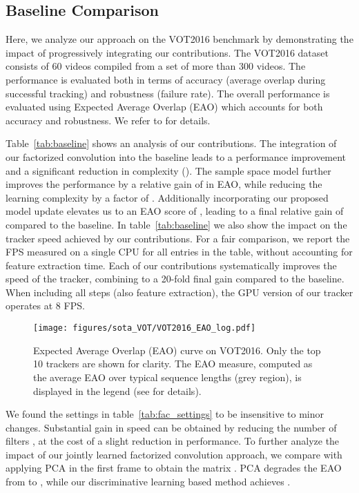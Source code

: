 \documentclass[10pt,twocolumn,letterpaper]{article}
\begin{document}
\subsection{Baseline Comparison}
\label{sec:baseline_results}

Here, we analyze our approach on the VOT2016 benchmark by demonstrating the impact of progressively integrating our contributions. The VOT2016 dataset consists of 60 videos compiled from a set of more than 300 videos. The performance is evaluated both in terms of accuracy (average overlap during successful tracking) and robustness (failure rate). The overall performance is evaluated using Expected Average Overlap (EAO) which accounts for both accuracy and robustness. We refer to \cite{VOT2015} for details.

Table~\ref{tab:baseline} shows an analysis of our contributions. The integration of our factorized convolution into the baseline leads to a performance improvement and a significant reduction in complexity (). The sample space model further improves the performance by a relative gain of  in EAO, while reducing the learning complexity by a factor of . Additionally incorporating our proposed model update elevates us to an EAO score of , leading to a final relative gain of  compared to the baseline. In table~\ref{tab:baseline} we also show the impact on the tracker speed achieved by our contributions. For a fair comparison, we report the FPS measured on a single CPU for all entries in the table, without accounting for feature extraction time. Each of our contributions systematically improves the speed of the tracker, combining to a 20-fold final gain compared to the baseline. When including all steps (also feature extraction), the GPU version of our tracker operates at 8 FPS.

\begin{figure}[!t]
	\centering \newcommand{\wid}{0.8\columnwidth}
	\texttt{[image: figures/sota\_VOT/VOT2016\_EAO\_log.pdf]}\vspace{-0.5mm}
	\caption{Expected Average Overlap (EAO) curve on VOT2016. Only the top 10 trackers are shown for clarity. The EAO measure, computed as the average EAO over typical sequence lengths (grey region), is displayed in the legend (see \cite{VOT2015} for details).
}\vspace{-2mm}\label{fig:vot_eao}
\end{figure}

We found the settings in table~\ref{tab:fac_settings} to be insensitive to minor changes. Substantial gain in speed can be obtained by reducing the number of filters , at the cost of a slight reduction in performance. To further analyze the impact of our jointly learned factorized convolution approach, we compare with applying PCA in the first frame to obtain the matrix . PCA degrades the EAO from  to , while our discriminative learning based method achieves .
\end{document}
